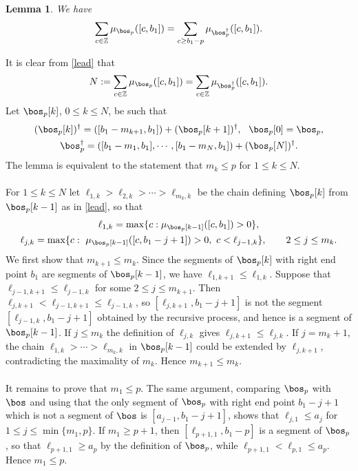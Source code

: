 \documentclass[11pt,reqno]{amsart}
\newtheorem*{lem}{Lemma}
\theoremstyle{definition} \newtheorem*{defn}{Definition}
\theoremstyle{definition}
\newenvironment{pf}{\proof}{\endproof}
\numberwithin{equation}{section}
\begin{document}
\begin{lem}\label{mpcount}
We have $$\displaystyle\sum_{c\in \mathbb Z}\mu_{\bos_p}([c,b_1])=\sum_{c\ge b_1-p}\mu_{\bos_p^\dagger}([c,b_1]).$$
\end{lem}
\begin{pf} It is clear from \eqref{lead} that
$$N:=\displaystyle\sum_{c\in \mathbb Z}\mu_{\bos_p}([c,b_1])=\sum_{c\in\mathbb Z}\mu_{\bos_p^\dagger}([c,b_1]).$$
Let $\bos_p[k]$, $0\le k\le N$, be such that
\begin{gather*}
(\bos_p[k])^\dagger=([b_1-m_{k+1}, b_1])+ (\bos_p[k+1])^\dagger,\ \ \bos_p[0]=\bos_p,\\
\bos_p^\dagger=([b_1-m_1, b_1],\cdots, [b_1-m_N, b_1])+ (\bos_p[N])^\dagger.
\end{gather*}
The lemma is equivalent to the statement that $m_k\le p$ for $1\le k\le N$.
\\\\
For $1\le k\le N$ let $\ell_{1,k}>\ell_{2,k}>\cdots>\ell_{m_k,k}$ be the chain defining $\bos_p[k]$
from $\bos_p[k-1]$ as in \eqref{lead}, so that
\begin{gather*}
\ell_{1,k}=\max\{c: \mu_{\bos_p[k-1]}([c,b_1])>0\}, \\
\ell_{j,k}=\max\{c:\ \mu_{\bos_p[k-1]}([c,b_1-j+1])>0,\ c<\ell_{j-1,k}\},\qquad 2\le j\le m_k.
\end{gather*}
We first show that $m_{k+1}\le m_k$. Since the segments of $\bos_p[k]$ with right end point $b_1$
are segments of $\bos_p[k-1]$, we have $\ell_{1,k+1}\le\ell_{1,k}$. Suppose that $\ell_{j-1,k+1}\le\ell_{j-1,k}$ for some $2\le j\le m_{k+1}$. Then
$\ell_{j,k+1}<\ell_{j-1,k+1}\le\ell_{j-1,k}$, so $[\ell_{j,k+1},b_1-j+1]$ is not the segment
$[\ell_{j-1,k},b_1-j+1]$ obtained by the recursive process, and hence is a segment of $\bos_p[k-1]$. If $j\le m_k$ the definition of $\ell_{j,k}$ gives
$\ell_{j,k+1}\le\ell_{j,k}$. If $j=m_k+1$, the chain $\ell_{1,k}>\cdots>\ell_{m_k,k}$ in
$\bos_p[k-1]$ could be extended by $\ell_{j,k+1}$, contradicting the maximality of $m_k$. Hence
$m_{k+1}\le m_k$.
\\\\
It remains to prove that $m_1\le p$. The same argument, comparing $\bos_p$ with $\bos$ and using
that the only segment of $\bos_p$ with right end point $b_1-j+1$ which is not a segment of $\bos$ is
$[a_{j-1},b_1-j+1]$, shows that $\ell_{j,1}\le a_j$ for $1\le j\le\min\{m_1,p\}$. If $m_1\ge p+1$,
then $[\ell_{p+1,1},b_1-p]$ is a segment of $\bos_p$, so that $\ell_{p+1,1}\ge a_p$ by the definition
of $\bos_p$, while $\ell_{p+1,1}<\ell_{p,1}\le a_p$. Hence $m_1\le p$.
\end{pf}
\end{document}
